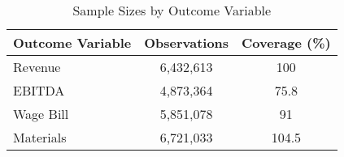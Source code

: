 \begin{table}[htbp]\centering
\caption{Sample Sizes by Outcome Variable}
\begin{tabular}{lcc}
\toprule
Outcome Variable & Observations & Coverage (\%) \\
\midrule
Revenue &    6,432,613 & 100 \\
EBITDA &    4,873,364 & 75.8 \\
Wage Bill &    5,851,078 & 91 \\
Materials &    6,721,033 & 104.5 \\
\bottomrule
\end{tabular}
\end{table}
